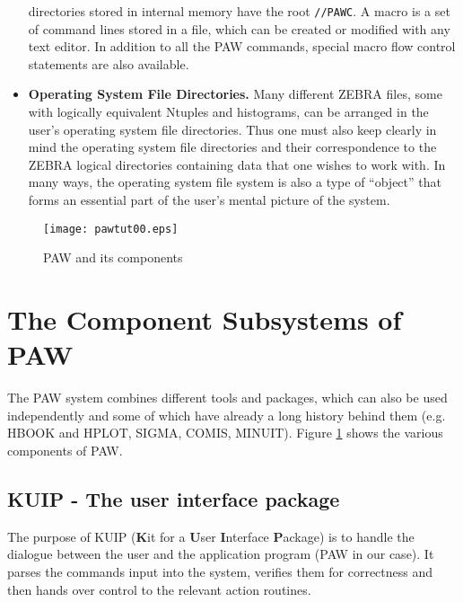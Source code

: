 \begin{itemize}
      directories stored in internal memory have the root \texttt{//PAWC}.
      A macro is a set of command lines stored in a file, which can be created 
      or modified with any text editor. In addition to all the PAW commands, 
      special macro flow control statements are also available.
\item {\bf Operating System File Directories.}  
      Many different ZEBRA files, some with logically equivalent Ntuples and 
      histograms, can be arranged in the user's operating system file 
      directories. Thus one must also keep clearly in mind the operating system
      file directories and their correspondence to the ZEBRA logical directories
      containing data that one wishes to work with.  In many ways, the operating
      system file system is also a type of ``object'' that forms an essential 
      part of the user's mental picture of the system.
\end{itemize}
 

\begin{figure}
\centering\texttt{[image: pawtut00.eps]}
\caption{PAW and its components}
\label{fig:PAWcomp}
\end{figure}

\section{The Component Subsystems of PAW}
\label{sec:pawstructure}

The PAW system combines different tools and packages, which
can also be used independently and some of which have already
a long history behind them (e.g. HBOOK and
HPLOT, SIGMA, COMIS, MINUIT).
Figure \ref{fig:PAWcomp} shows the various components of PAW.

\subsection{KUIP - The user interface package}
 
The purpose of KUIP
({\bf K}it for a {\bf U}ser
{\bf I}nterface {\bf P}ackage) is to handle
the dialogue between the user and the application program (PAW
in our case). It
parses the commands input into the system, verifies them for
correctness and then hands over control to the relevant action
routines.
 
